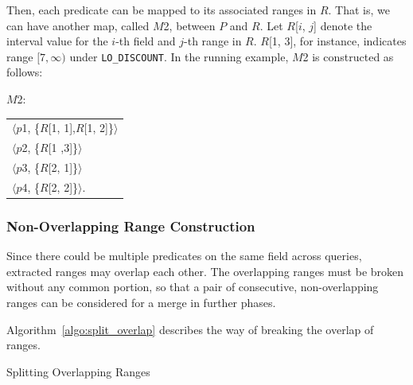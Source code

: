 \documentclass[paper]{ieice}
\def\ropenrange#1{$[{#1})$}
\begin{document}
Then, each predicate can be mapped to its associated ranges in $R$. That is, 
we can have another map, called $M$2, between $P$ and $R$. 
Let $R$[$i$, $j$] denote the interval value for the $i$-th field and $j$-th range in $R$. 
$R$[1, 3], for instance, indicates range \ropenrange{7, \infty} under {\tt LO\_DISCOUNT}. 
In the running example, $M$2 is constructed as follows:

$M$2:
\begin{center}
\begin{tabular}{l}
$\langle${$p$1}, \{$R$[1, 1],$R$[1, 2]\}$\rangle$ \\
$\langle${$p$2}, \{$R$[1 ,3]\}$\rangle$ \\ 
$\langle${$p$3}, \{$R$[2, 1]\}$\rangle$ \\
$\langle${$p$4}, \{$R$[2, 2]\}$\rangle$. \\
\end{tabular}
\end{center} 

\subsubsection{Non-Overlapping Range Construction}

Since there could be multiple predicates on the same field across queries, 
extracted ranges may overlap each other. 
The overlapping ranges must be broken without any common portion, so that 
a pair of consecutive, \hbox{non-overlapping} ranges can be 
considered for a merge in further phases. 

Algorithm~\ref{algo:split_overlap} describes the way of breaking 
the \hbox{overlap} of ranges. 

\vspace{-.1in}

\begin{algorithm}[h]
{
}
\caption{Splitting Overlapping Ranges}
\label{algo:split_overlap}
\end{algorithm}
\end{document}
